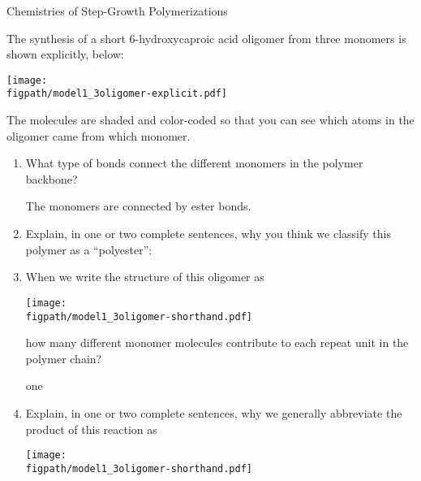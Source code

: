 \begin{activity}{Chemistries of Step-Growth Polymerizations}
\begin{ctqs}
		\question The synthesis of a short 6-hydroxycaproic acid oligomer from three monomers is shown explicitly, below: \label{\labelbase:ctq:6hcpa-oligomer}
	
\vspace{0.25in}	\centerline{\texttt{[image: \\figpath/model1\_3oligomer-explicit.pdf]}}
The molecules are shaded and color-coded so that you can see which atoms in the oligomer came from which monomer.
		
		\begin{enumerate}
		
			\item What type of bonds connect the different monomers in the polymer backbone?
			
				\begin{solution}[1.5in]
					The monomers are connected by ester bonds.
				\end{solution}
		
			\item Explain, in one or two complete sentences, why you think we classify this polymer as a ``polyester'':
			
				\begin{solution}[2in]\studentdisplay{~}\end{solution}
	
			\item When we write the structure of this oligomer as
	
	\centerline{\texttt{[image: \\figpath/model1\_3oligomer-shorthand.pdf]}}
	\vspace{-3pt}
	how many different monomer molecules contribute to each repeat unit in the polymer chain?
			
				\begin{solution}[1in]
					one
				\end{solution}
		
			\item Explain, in one or two complete sentences, why we generally abbreviate the product of this reaction as
	
	\centerline{\texttt{[image: \\figpath/model1\_3oligomer-shorthand.pdf]}}
	

\end{enumerate}
\end{ctqs}
\end{activity}
